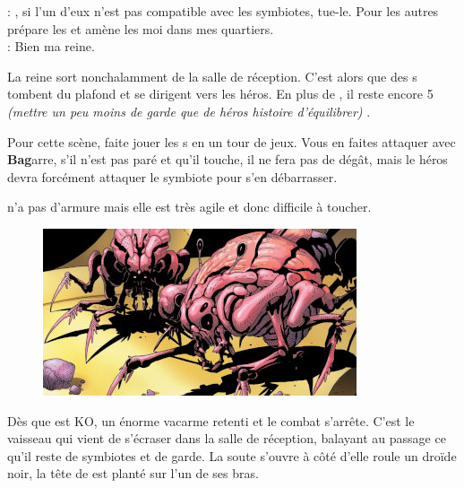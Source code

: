 \begin{quotebox}
\noindent\textbf{}: , si l’un d’eux n’est pas compatible avec les symbiotes, tue-le. Pour les autres prépare les et amène les moi dans mes quartiers.\\
\noindent\textbf{}: Bien ma reine.
\end{quotebox}
La reine sort nonchalamment de la salle de réception. C’est alors que des s tombent du plafond et se dirigent vers les héros. En plus de , il reste encore 5 \textit{(mettre un peu moins de garde que de héros histoire d’équilibrer)} .

Pour cette scène, faite jouer les s en un tour de jeux. Vous en faites attaquer avec \textbf{Bag}arre, s’il n’est pas paré et qu’il touche, il ne fera pas de dégât, mais le héros devra forcément attaquer le symbiote pour s’en débarrasser.

 n’a pas d’armure mais elle est très agile et donc difficile à toucher.

\begin{figure}[h]
\noindent\includegraphics[width=\linewidth]{_img/bestiary/symbiote-abersyn.jpg}
\caption{}
\end{figure}
Dès que  est KO, un énorme vacarme retenti et le combat s’arrête. C’est le vaisseau  qui vient de s’écraser dans la salle de réception, balayant au passage ce qu’il reste de symbiotes et de garde.
La soute s’ouvre  à côté d’elle roule un droïde noir, la tête de  est planté sur l’un de ses bras.

